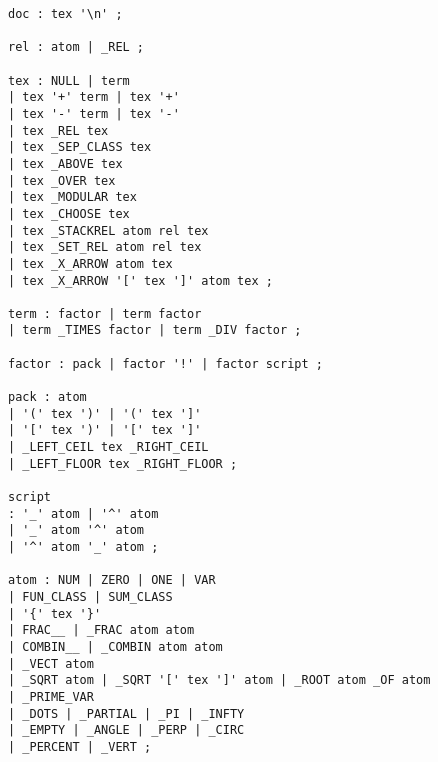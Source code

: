%
%
\label{grammarRules}

\begin{verbatim}
doc : tex '\n' ;

rel : atom | _REL ;

tex : NULL | term 
| tex '+' term | tex '+' 
| tex '-' term | tex '-' 
| tex _REL tex 
| tex _SEP_CLASS tex 
| tex _ABOVE tex 
| tex _OVER tex 
| tex _MODULAR tex 
| tex _CHOOSE tex  
| tex _STACKREL atom rel tex 
| tex _SET_REL atom rel tex 
| tex _X_ARROW atom tex 
| tex _X_ARROW '[' tex ']' atom tex ;

term : factor | term factor 
| term _TIMES factor | term _DIV factor ;

factor : pack | factor '!' | factor script ;

pack : atom 
| '(' tex ')' | '(' tex ']' 
| '[' tex ')' | '[' tex ']' 
| _LEFT_CEIL tex _RIGHT_CEIL 
| _LEFT_FLOOR tex _RIGHT_FLOOR ;

script
: '_' atom | '^' atom 
| '_' atom '^' atom
| '^' atom '_' atom ;

atom : NUM | ZERO | ONE | VAR 
| FUN_CLASS | SUM_CLASS 
| '{' tex '}' 
| FRAC__ | _FRAC atom atom 
| COMBIN__ | _COMBIN atom atom 
| _VECT atom 
| _SQRT atom | _SQRT '[' tex ']' atom | _ROOT atom _OF atom 
| _PRIME_VAR 
| _DOTS | _PARTIAL | _PI | _INFTY 
| _EMPTY | _ANGLE | _PERP | _CIRC 
| _PERCENT | _VERT ;
\end{verbatim}

